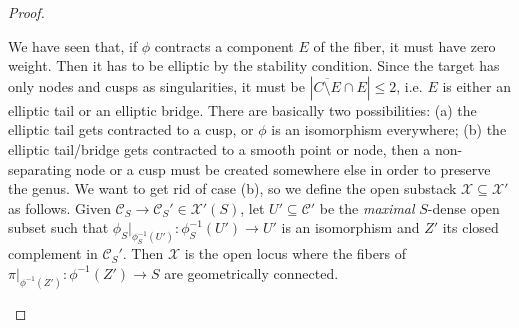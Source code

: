 \documentclass[11pt]{amsart}
\renewcommand{\to}{\rightarrow}
\theoremstyle{plain}
\theoremstyle{definition}
\begin{document}
\begin{proof}
\begin{description}[labelindent=0cm,leftmargin=\parindent]
\item[Step 4] We have seen that, if $\phi$ contracts a component $E$ of the fiber, it must have zero weight. Then it has to be elliptic by the stability condition. Since the target has only nodes and cusps as singularities, it must be $|\overline{C\setminus E}\cap E|\leq 2$, i.e. $E$ is either an elliptic tail or an elliptic bridge. There are basically two possibilities:
(a) the elliptic tail gets contracted to a cusp, or $\phi$ is an isomorphism everywhere; (b) the elliptic tail/bridge gets contracted to a smooth point or node, then a non-separating node or a cusp must be created somewhere else in order to preserve the genus. 
We want to get rid of case (b), so we define the open substack $\mathcal X\subseteq \mathcal X'$ as follows.
Given $\mathcal{C}_S\to\mathcal C_S'\in\mathcal X'(S)$, let $U'\subseteq \mathcal C'$ be the \emph{maximal} $S$-dense open subset such that $\phi_S|_{\phi_S^{-1}(U')}\colon\phi_S^{-1}(U')\to U'$ is an isomorphism and $Z'$ its closed complement in $\mathcal C_S'$. 
Then $\mathcal X$ is the open locus \cite[\href{http://stacks.math.columbia.edu/tag/055D}{Tag 055D}, \href{http://stacks.math.columbia.edu/tag/055G}{Tag 055G}]{stacks-project} where the fibers of $\pi|_{\phi^{-1}(Z')}\colon \phi^{-1}(Z')\to S$ are geometrically connected.
\end{description} 
 \end{proof}
 
\end{document}
